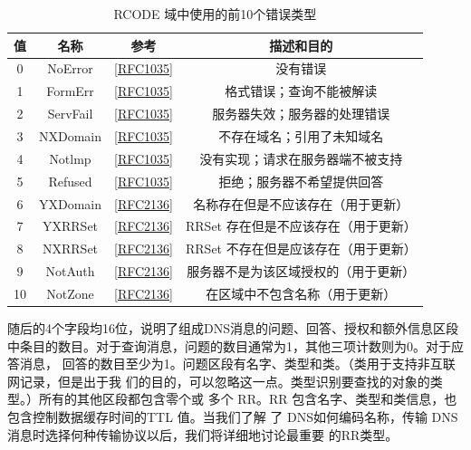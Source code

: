 \begin{table}[]
  \centering
  \caption{RCODE 域中使用的前10个错误类型}
  \begin{tabular}{c|c|c|c}
    \hline
    值  &  名称  &  参考  &  描述和目的  \\ \hline
    0  &  NoError  &
    \href{https://www.rfc-editor.org/rfc/rfc1035}{[RFC1035]}  &  没有错误
    \\ \hline
    1  &  FormErr  &
    \href{https://www.rfc-editor.org/rfc/rfc1035}{[RFC1035]}  &
    格式错误；查询不能被解读    \\ \hline
    2  &  ServFail  &
    \href{https://www.rfc-editor.org/rfc/rfc1035}{[RFC1035]}  &
    服务器失效；服务器的处理错误    \\ \hline
    3  &  NXDomain  &
    \href{https://www.rfc-editor.org/rfc/rfc1035}{[RFC1035]}  &
    不存在域名；引用了未知域名  \\ \hline
    4  &  Notlmp  &
    \href{https://www.rfc-editor.org/rfc/rfc1035}{[RFC1035]}  &
    没有实现；请求在服务器端不被支持    \\ \hline
    5  &  Refused  &
    \href{https://www.rfc-editor.org/rfc/rfc1035}{[RFC1035]}  &
    拒绝；服务器不希望提供回答  \\ \hline
    6  &  YXDomain  &
    \href{https://www.rfc-editor.org/rfc/rfc2136}{[RFC2136]}  &
    名称存在但是不应该存在（用于更新）  \\ \hline
    7  &  YXRRSet  &
    \href{https://www.rfc-editor.org/rfc/rfc2136}{[RFC2136]}  &
    RRSet 存在但是不应该存在（用于更新）    \\ \hline
    8  &  NXRRSet  &
    \href{https://www.rfc-editor.org/rfc/rfc2136}{[RFC2136]}  &
    RRSet 不存在但是应该存在（用于更新）    \\ \hline
    9  &  NotAuth  &
    \href{https://www.rfc-editor.org/rfc/rfc2136}{[RFC2136]}  &
    服务器不是为该区域授权的（用于更新）    \\ \hline
    10  &  NotZone  &
    \href{https://www.rfc-editor.org/rfc/rfc2136}{[RFC2136]}  &
    在区域中不包含名称（用于更新）  \\ \hline
  \end{tabular}
\end{table}

随后的4个字段均16位，说明了组成DNS消息的问题、回答、授权和额外信息区段
中条目的数目。对于查询消息，问题的数目通常为1，其他三项计数则为0。对于应答消息，
回答的数目至少为1。问题区段有名字、类型和类。（类用于支持非互联网记录，但是出于我
们的目的，可以忽略这一点。类型识别要查找的对象的类型。）所有的其他区段都包含零个或
多个 RR。RR 包含名字、类型和类信息，也包含控制数据缓存时间的TTL 值。当我们了解
了 DNS如何编码名称，传输 DNS 消息时选择何种传输协议以后，我们将详细地讨论最重要
的RR类型。

